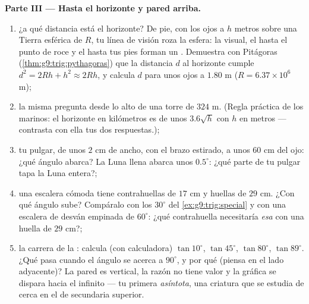 \begin{problem}
\medskip
\noindent\textbf{Parte III --- Hasta el horizonte y pared arriba.}
\begin{enumerate}[resume]
  \item ¿a qué distancia está el horizonte? De pie, con los ojos a $h$ metros
        sobre una Tierra esférica de  $R$, tu línea de
        visión roza la esfera: la visual, el  hasta
        el punto de roce y el  hasta tus pies forman un
        . Demuestra con Pitágoras
        (\cref{thm:g9:trig:pythagoras}) que la distancia $d$ al
        horizonte cumple $d^2 = 2Rh + h^2 \approx 2Rh$,
        y calcula $d$ para unos ojos a $1.80$ m
        ($R = 6.37 \times 10^6$ m);
  \item la misma pregunta desde lo alto de una torre de $324$ m. (Regla práctica
        de los marinos: el horizonte en kilómetros es de unos
        $3.6\sqrt{h}$ con $h$ en metros --- contrasta con ella tus dos
        respuestas.);
  \item tu pulgar, de unos $2$ cm de ancho, con el brazo estirado,
        a unos $60$ cm del ojo: ¿qué ángulo abarca?
        La Luna llena abarca unos $0.5^\circ$: ¿qué parte de tu
        pulgar tapa la Luna entera?;
  \item una escalera cómoda tiene contrahuellas de $17$ cm y huellas de
        $29$ cm. ¿Con qué ángulo sube? Compáralo con los
        $30^\circ$ del \cref{ex:g9:trig:special} y con una
        escalera de desván empinada de $60^\circ$: ¿qué contrahuella
        necesitaría \emph{esa} con una huella de $29$ cm?;
  \item la carrera de la : calcula (con calculadora)
        $\tan 10^\circ$, $\tan 45^\circ$, $\tan 80^\circ$,
        $\tan 89^\circ$. ¿Qué pasa cuando el ángulo se acerca a
        $90^\circ$, y por qué (piensa en el lado adyacente)? La pared es
        vertical, la razón no tiene valor y la gráfica se dispara
        hacia el infinito --- tu primera \emph{asíntota}, una criatura
        que se estudia de cerca en el  de secundaria superior.
\end{enumerate}
\end{problem}
